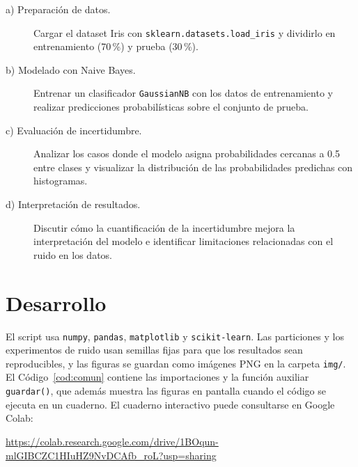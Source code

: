 \documentclass[11pt,letterpaper]{article}
\begin{document}
\begin{description}
    \item[a) Preparación de datos.] Cargar el dataset Iris con \texttt{sklearn.datasets.load\_iris} y dividirlo en entrenamiento (70\,\%) y prueba (30\,\%).
    \item[b) Modelado con Naive Bayes.] Entrenar un clasificador \texttt{GaussianNB} con los datos de entrenamiento y realizar predicciones probabilísticas sobre el conjunto de prueba.
    \item[c) Evaluación de incertidumbre.] Analizar los casos donde el modelo asigna probabilidades cercanas a 0.5 entre clases y visualizar la distribución de las probabilidades predichas con histogramas.
    \item[d) Interpretación de resultados.] Discutir cómo la cuantificación de la incertidumbre mejora la interpretación del modelo e identificar limitaciones relacionadas con el ruido en los datos.
\end{description}

\section{Desarrollo}

El script usa \texttt{numpy}, \texttt{pandas}, \texttt{matplotlib} y \texttt{scikit-learn}. Las particiones y los experimentos de ruido usan semillas fijas para que los resultados sean reproducibles, y las figuras se guardan como imágenes PNG en la carpeta \texttt{img/}. El Código~\ref{cod:comun} contiene las importaciones y la función auxiliar \texttt{guardar()}, que además muestra las figuras en pantalla cuando el código se ejecuta en un cuaderno. El cuaderno interactivo puede consultarse en Google Colab:

\begin{center}
    \url{https://colab.research.google.com/drive/1BOqun-mlGIBCZC1HIuHZ9NvDCAfb_roL?usp=sharing}
\end{center}
\end{document}
